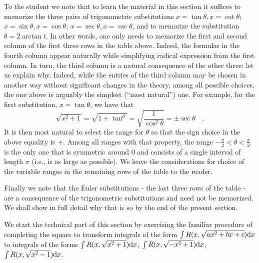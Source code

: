 \documentclass[12pt]{book}
\begin{document}
To the student we note that to learn the material in this section it suffices to memorize the three pairs of trigonometric substitutions $x=\tan \theta, x= \cot \theta$; $x=\sin \theta, x= \cos \theta$; $x=\sec \theta, x=\csc \theta$, and to memorize the substitution $\theta=2\arctan t$. In other words, one only needs to memorize the first and second column of the first three rows in the table above. Indeed, the formulas in the fourth column appear naturally while simplifying radical expression from the first column. In turn, the third column is a natural consequence of the other three: let us explain why. Indeed, while the entries of the third column may be chosen in another way without significant changes in the theory, among all possible choices, the one above is arguably the simplest (``most natural'') one. For example, for the first substitution, $x=\tan \theta$, we have that
\[
\sqrt{x^2+1}= \sqrt{ 1+\tan^\theta}= \sqrt{\frac{1}{\cos^2 \theta}}=\pm \sec \theta\quad .
\]
It is then most natural to select the range for $\theta$ so that the sign choice in the above equality is $+$. Among all ranges with that property, the range $-\frac{\pi }{2}< \theta < \frac{\pi }{2}$ is the only one that is symmetric around $0$ and consists of a single interval of length $\pi$ (i.e., is as large as possible). We leave the considerations for choice of the variable ranges in the remaining rows of the table to the reader.

Finally we note that the Euler substitutions - the last three rows of the table - are a consequence of the trigonometric substitutions and need not be memorized. We shall show in full detail why that is so by the end of the present section.

We start the technical part of this section by exercising the familiar procedure of completing the square to transform integrals of the form $\int R(x,\sqrt{ax^2+bx+c}) {\normalfont \text{d}} x$ to integrals of the forms $\int R(x, \sqrt{x^2+1}){\normalfont \text{d}} x$,  $\int R(x, \sqrt{-x^2+1}){\normalfont \text{d}} x$, $\int R(x, \sqrt{x^2-1}){\normalfont \text{d}} x$.
\end{document}
